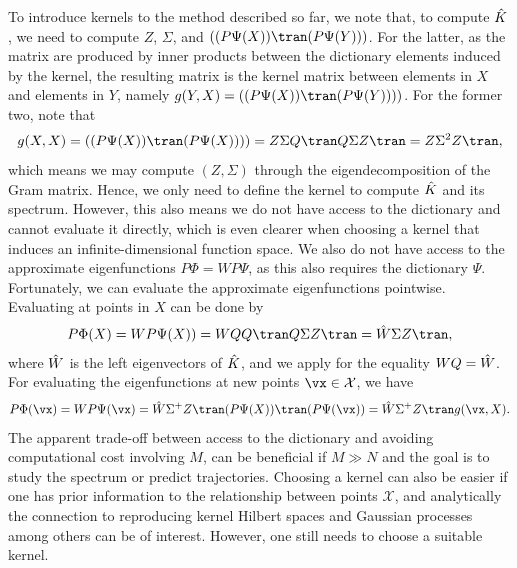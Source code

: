 \documentclass{article}
\begin{document}
To introduce kernels to the method described so far, we note that, to compute \(\Hat K\), we need to compute \(Z\), \(\Sigma\), and \(((P\Psi(X))\tran (P\Psi(Y)))\). For the latter, as the matrix are produced by inner products between the dictionary elements induced by the kernel, the resulting matrix is the kernel matrix between elements in \(X\) and elements in \(Y\), namely \(g(Y,X) =((P\Psi(X))\tran (P\Psi(Y))))\). For the former two, note that 
\begin{align*}
    g(X,X) =((P\Psi(X))\tran (P\Psi(X)))) = Z\Sigma Q\tran Q \Sigma Z\tran = Z\Sigma^2 Z\tran,
\end{align*}
which means we may compute \((Z, \Sigma)\) through the eigendecomposition of the Gram matrix. Hence, we only need to define the kernel to compute \(\Hat K \) and its spectrum. However, this also means we do not have access to the dictionary and cannot evaluate it directly, which is even clearer when choosing a kernel that induces an infinite-dimensional function space. We also do not have access to the approximate eigenfunctions \(P\Phi = WP\Psi\), as this also requires the dictionary \(\Psi\). Fortunately, we can evaluate the approximate eigenfunctions pointwise. Evaluating at points in \(X\) can be done by
\begin{align*}
   P\Phi(X) = W P \Psi(X)) = WQQ\tran Q \Sigma Z\tran = \Hat W \Sigma Z\tran,
\end{align*}
where \(\Hat W\) is the left eigenvectors of \(\Hat K\), and we apply  for the equality \(WQ = \Hat W\). For evaluating the eigenfunctions at new points \(\vx \in \mathcal{X}\), we have
\begin{align*}
    P\Phi(\vx) = WP\Psi(\vx) = \Hat W \Sigma^+ Z\tran (P\Psi(X))\tran(P\Psi(\vx)) = \Hat W \Sigma^+ Z\tran g(\vx, X).
\end{align*}
The apparent trade-off between access to the dictionary and avoiding computational cost involving \(M\), can be beneficial if \(M \gg N\) and the goal is to study the spectrum or predict trajectories. Choosing a kernel can also be easier if one has prior information to the relationship between points \(\mathcal{X}\), and analytically the connection to reproducing kernel Hilbert spaces and Gaussian processes among others can be of interest. However, one still needs to choose a suitable kernel.
\end{document}
